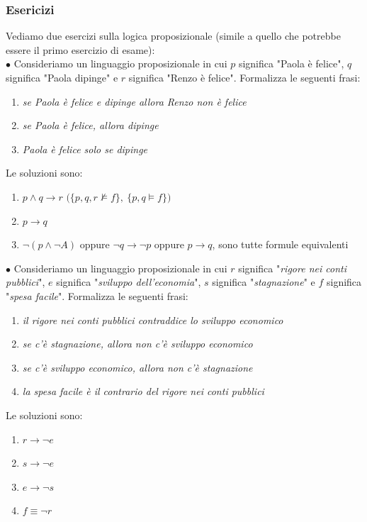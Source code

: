\subsubsection{Esericizi}
Vediamo due esercizi sulla logica proposizionale (simile a quello che potrebbe essere il primo esercizio di esame):\smallskip\\
$\bullet$ Consideriamo un linguaggio proposizionale in cui $p$ significa "Paola è felice", $q$ significa "Paola dipinge" e $r$
significa "Renzo è felice". Formalizza le seguenti frasi:
\begin{enumerate}
    \item \textit{se Paola è felice e dipinge allora Renzo non è felice}
    \item \textit{se Paola è felice, allora dipinge}
    \item \textit{Paola è felice solo se dipinge}
\end{enumerate}
Le soluzioni sono:
\begin{enumerate}
    \item $p \wedge q \to r$  $\big(\{p,q,r \not\models f\}, \ \{ p,q \models f\}\big)$
    \item $p \to q$
    \item $\neg(p \wedge \neg A)$ oppure $\neg q \to \neg p$ oppure $p \to q$, sono tutte formule equivalenti
\end{enumerate}


\noindent $\bullet$ Consideriamo un linguaggio proposizionale in cui $r$ significa "\textit{rigore nei conti pubblici}", 
$e$ significa "\textit{sviluppo dell'economia}", $s$ significa "\textit{stagnazione}" e $f$ significa "\textit{spesa facile}". 
Formalizza le seguenti frasi: 

\begin{enumerate}
    \item \textit{il rigore nei conti pubblici contraddice lo sviluppo economico} 
    \item \textit{se c'è stagnazione, allora non c'è sviluppo economico} 
    \item \textit{se c'è sviluppo economico, allora non c'è stagnazione} 
    \item \textit{la spesa facile è il contrario del rigore nei conti pubblici} 
\end{enumerate}
Le soluzioni sono:
\begin{enumerate}
    \item $r  \to\neg e$
    \item $s \to \neg e$
    \item $e \to \neg s$
    \item $f \equiv \neg r$
\end{enumerate}




